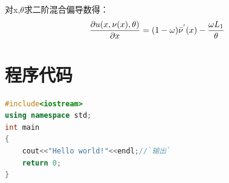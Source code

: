 \par 对x,$\theta$求二阶混合偏导数得： \\
\begin{equation}
\centering
 \frac{\partial u(x,\nu(x),\theta)}{\partial x} = (1-\omega)\bar \nu^{'}(x)-\frac{\omega L_1}{\theta}
\end{equation}
\newpage

\section{程序代码}
\begin{lstlisting}[language=C++,escapeinside=``]
#include<iostream>
using namespace std;
int main
{
	cout<<"Hello world!"<<endl;//`输出`
	return 0;
}
\end{lstlisting}